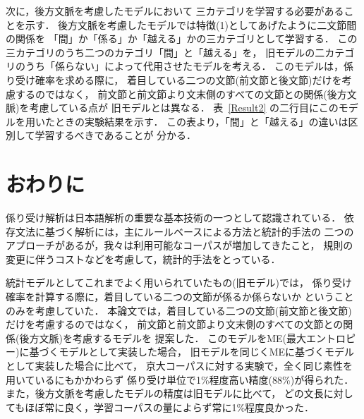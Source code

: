 次に，後方文脈を考慮したモデルにおいて
三カテゴリを学習する必要があることを示す．
後方文脈を考慮したモデルでは特徴(1)としてあげたように二文節間の関係を
「間」か「係る」か「越える」かの三カテゴリとして学習する．
この三カテゴリのうち二つのカテゴリ「間」と「越える」を，
旧モデルの二カテゴリのうち「係らない」によって代用させたモデルを考える．
このモデルは，係り受け確率を求める際に，
着目している二つの文節(前文節と後文節)だけを考慮するのではなく，
前文節と前文節より文末側のすべての文節との関係(後方文脈)を考慮している点が
旧モデルとは異なる．
表~\ref{Result2} の二行目にこのモデルを用いたときの実験結果を示す．
この表より，「間」と「越える」の違いは区別して学習するべきであることが
分かる．

\section{おわりに}
\label{sec:conclusion}

係り受け解析は日本語解析の重要な基本技術の一つとして認識されている．
依存文法に基づく解析には，主にルールベースによる方法と統計的手法の
二つのアプローチがあるが，我々は利用可能なコーパスが増加してきたこと，
規則の変更に伴うコストなどを考慮して，統計的手法をとっている．

統計モデルとしてこれまでよく用いられていたもの(旧モデル)では，
係り受け確率を計算する際に，着目している二つの文節が係るか係らないか
ということのみを考慮していた．
本論文では，着目している二つの文節(前文節と後文節)だけを考慮するのではなく，
前文節と前文節より文末側のすべての文節との関係(後方文脈)を考慮するモデルを
提案した．
このモデルをME(最大エントロピー)に基づくモデルとして実装した場合，
旧モデルを同じくMEに基づくモデルとして実装した場合に比べて，
京大コーパスに対する実験で，全く同じ素性を用いているにもかかわらず
係り受け単位で1\%程度高い精度(88\%)が得られた．
また，後方文脈を考慮したモデルの精度は旧モデルに比べて，
どの文長に対してもほぼ常に良く，学習コーパスの量によらず常に1\%程度良かった．







